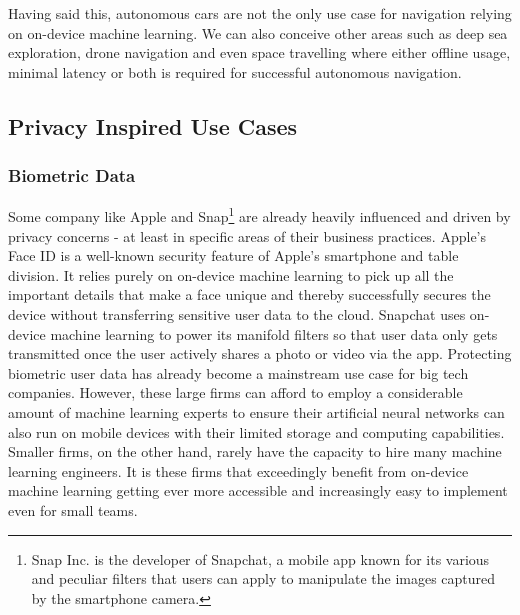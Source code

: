\documentclass[
			   fontsize=11pt,
               paper=a4,
               bibliography=totoc,
               idxtotoc,
               headsepline,
               footsepline,
               footinclude=false,
               BCOR=12mm,
               DIV=13,
               openany,   %
               oneside    %
               ]
               {scrbook}
\begin{document}
Having said this, autonomous cars are not the only use case for navigation relying on on-device machine learning. We can also conceive other areas such as deep sea exploration, drone navigation and even space travelling where either offline usage, minimal latency or both is required for successful autonomous navigation.

\subsection{Privacy Inspired Use Cases}

\subsubsection{Biometric Data}
Some company like Apple and Snap\footnote{Snap Inc. is the developer of Snapchat, a mobile app known for its various and peculiar filters that users can apply to manipulate the images captured by the smartphone camera.} are already heavily influenced and driven by privacy concerns - at least in specific areas of their business practices. Apple's Face ID is a well-known security feature of Apple's smartphone and table division. It relies purely on on-device machine learning to pick up all the important details that make a face unique and thereby successfully secures the device without transferring sensitive user data to the cloud. Snapchat uses on-device machine learning to power its manifold filters so that user data only gets transmitted once the user actively shares a photo or video via the app. Protecting biometric user data has already become a mainstream use case for big tech companies. However, these large firms can afford to employ a considerable amount of machine learning experts to ensure their artificial neural networks can also run on mobile devices with their limited storage and computing capabilities. Smaller firms, on the other hand, rarely have the capacity to hire many machine learning engineers. It is these firms that exceedingly benefit from on-device machine learning getting ever more accessible and increasingly easy to implement even for small teams.
\end{document}
